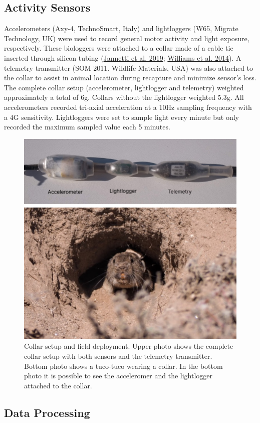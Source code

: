 \documentclass[english,msc,numbers,hidelinks]{coppe}
\begin{document}
  \hypertarget{activity-sensors}{%
  \subsection{Activity Sensors}\label{activity-sensors}}

  Accelerometers (Axy-4, TechnoSmart, Italy) and lightloggers (W65, Migrate Technology, UK) were used to record general motor activity and light exposure, respectively. These biologgers were attached to a collar made of a cable tie inserted through silicon tubing (\protect\hyperlink{ref-jannetti2019}{Jannetti et al. 2019}; \protect\hyperlink{ref-williams2014}{Williams et al. 2014}). A telemetry transmitter (SOM-2011. Wildlife Materials, USA) was also attached to the collar to assist in animal location during recapture and minimize sensor's loss. The complete collar setup (accelerometer, lightlogger and telemetry) weighted approximately a total of 6g. Collars without the lightlogger weighted 5.3g. All accelerometers recorded tri-axial acceleration at a 10Hz sampling frequency with a 4G sensitivity. Lightloggers were set to sample light every minute but only recorded the maximum sampled value each 5 minutes.
  \begin{figure}

  {\centering \includegraphics[width=1\linewidth]{../04_figures/collar/collar_tuco} 

  }

  \caption{Collar setup and field deployment. Upper photo shows the complete collar setup with both sensors and the telemetry transmitter. Bottom photo shows a tuco-tuco wearing a collar. In the bottom photo it is possible to see the acceleromer and the lightlogger attached to the collar.}\label{fig:methods-collar}
  \end{figure}
  \hypertarget{data-processing}{%
  \subsection{Data Processing}\label{data-processing}}
\end{document}
